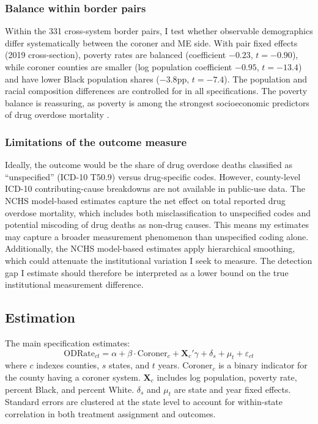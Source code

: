 \documentclass[12pt]{article}
\begin{document}
\subsubsection*{Balance within border pairs} Within the 331 cross-system border pairs, I test whether observable demographics differ systematically between the coroner and ME side. With pair fixed effects (2019 cross-section), poverty rates are balanced (coefficient $-0.23$, $t = -0.90$), while coroner counties are smaller (log population coefficient $-0.95$, $t = -13.4$) and have lower Black population shares ($-3.8$pp, $t = -7.4$). The population and racial composition differences are controlled for in all specifications. The poverty balance is reassuring, as poverty is among the strongest socioeconomic predictors of drug overdose mortality \citep{case2015rising}.

\subsubsection*{Limitations of the outcome measure} Ideally, the outcome would be the share of drug overdose deaths classified as ``unspecified'' (ICD-10 T50.9) versus drug-specific codes. However, county-level ICD-10 contributing-cause breakdowns are not available in public-use data. The NCHS model-based estimates capture the net effect on total reported drug overdose mortality, which includes both misclassification to unspecified codes and potential miscoding of drug deaths as non-drug causes. This means my estimates may capture a broader measurement phenomenon than unspecified coding alone. Additionally, the NCHS model-based estimates apply hierarchical smoothing, which could attenuate the institutional variation I seek to measure. The detection gap I estimate should therefore be interpreted as a lower bound on the true institutional measurement difference.

\subsection{Estimation}

The main specification estimates:
\begin{equation}
\text{ODRate}_{ct} = \alpha + \beta \cdot \text{Coroner}_c + \mathbf{X}_c'\gamma + \delta_s + \mu_t + \varepsilon_{ct}
\label{eq:main}
\end{equation}
where $c$ indexes counties, $s$ states, and $t$ years. $\text{Coroner}_c$ is a binary indicator for the county having a coroner system. $\mathbf{X}_c$ includes log population, poverty rate, percent Black, and percent White. $\delta_s$ and $\mu_t$ are state and year fixed effects. Standard errors are clustered at the state level to account for within-state correlation in both treatment assignment and outcomes.
\end{document}

